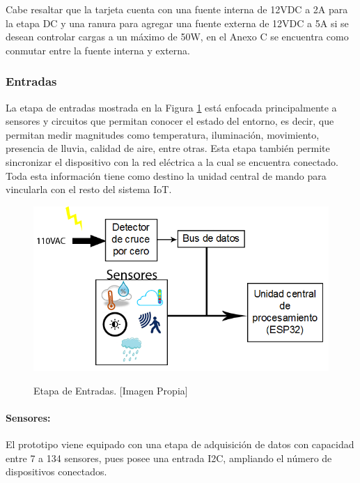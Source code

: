 		Cabe resaltar que la tarjeta cuenta con una fuente interna de 12VDC a 2A para la etapa DC y una ranura para agregar una fuente externa de 12VDC a 5A si se desean controlar cargas a un máximo de 50W, en el Anexo C se encuentra como conmutar entre la fuente interna y externa.\\
	
	\subsubsection{Entradas}
	
	La etapa de entradas mostrada en la Figura \ref{fig:BEntradas} está enfocada principalmente a sensores y circuitos que permitan conocer el estado del entorno, es decir, que permitan medir magnitudes como temperatura, iluminación, movimiento, presencia de lluvia, calidad de aire, entre otras. Esta etapa también permite sincronizar el dispositivo con la red eléctrica a la cual se encuentra conectado. Toda esta información tiene como destino la unidad central de mando para vincularla con el resto del sistema IoT.\\
	
	\begin{figure}[!t]
		\centering
		\caption[Etapa de Entradas.]{Etapa de Entradas. [Imagen Propia]}
		\includegraphics[width=0.6\linewidth]{Imagenes/B_Entradas}\label{fig:BEntradas}
	\end{figure}
	
	\paragraph{Sensores:}
		El prototipo viene equipado con una etapa de adquisición de datos con capacidad entre 7 a 134 sensores, pues posee una entrada I2C, ampliando el número de dispositivos conectados.\\
		
